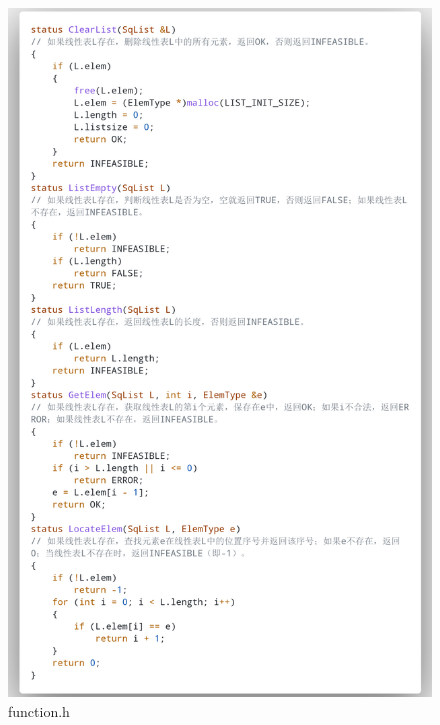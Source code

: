 \documentclass[supercite]{Experimental_Report}
\theoremstyle{definition}
\begin{document}
\begin{figure}[htb]
	\begin{center}
		\includegraphics[scale=0.30]{images/3-3.png}
		\caption{function.h}
		\label{fig3-3}
	\end{center}
\end{figure}
\end{document}
